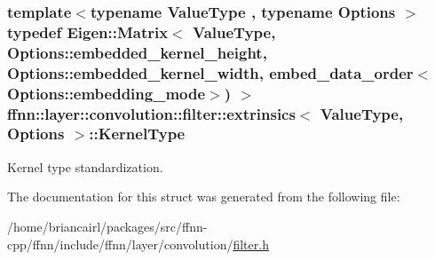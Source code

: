 \hypertarget{structffnn_1_1layer_1_1convolution_1_1filter_1_1extrinsics_a0b687a9387270004cdaa00c19bef26da}{
\subsubsection[{Kernel\-Type}]{\setlength{\rightskip}{0pt plus 5cm}template$<$typename Value\-Type , typename Options $>$ typedef Eigen\-::\-Matrix$<$ Value\-Type, Options\-::embedded\-\_\-kernel\-\_\-height, Options\-::embedded\-\_\-kernel\-\_\-width, {\bf embed\-\_\-data\-\_\-order}$<$Options\-::embedding\-\_\-mode$>$) $>$ {\bf ffnn\-::layer\-::convolution\-::filter\-::extrinsics}$<$ Value\-Type, Options $>$\-::{\bf Kernel\-Type}}}\label{structffnn_1_1layer_1_1convolution_1_1filter_1_1extrinsics_a0b687a9387270004cdaa00c19bef26da}


Kernel type standardization. 



The documentation for this struct was generated from the following file\-:\begin{DoxyCompactItemize}
\item 
/home/briancairl/packages/src/ffnn-\/cpp/ffnn/include/ffnn/layer/convolution/\hyperlink{filter_8h}{filter.\-h}\end{DoxyCompactItemize}
